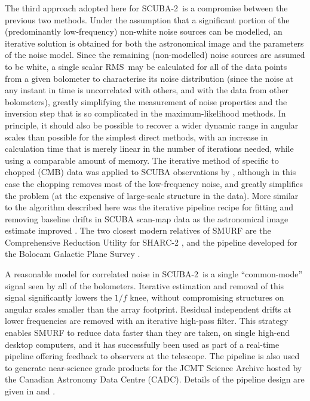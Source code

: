 \documentclass[useAMS,usenatbib,nofootinbib]{mn2e}
\newcommand{\scuba}{SCUBA-2}
\newcommand{\rms}{RMS}
\begin{document}
The third approach adopted here for \scuba\ is a compromise between
the previous two methods. Under the assumption that a significant
portion of the (predominantly low-frequency) non-white noise sources
can be modelled, an iterative solution is obtained for both the
astronomical image and the parameters of the noise model. Since the
remaining (non-modelled) noise sources are assumed to be white, a
single scalar \rms\ may be calculated for all of the data points from
a given bolometer to characterise its noise distribution (since the
noise at any instant in time is uncorrelated with others, and with the
data from other bolometers), greatly simplifying the measurement of
noise properties and the inversion step that is so complicated in the
maximum-likelihood methods. In principle, it should also be possible
to recover a wider dynamic range in angular scales than possible for
the simplest direct methods, with an increase in calculation time that
is merely linear in the number of iterations needed, while using a
comparable amount of memory. The iterative method of
\citet{wright1996} specific to chopped (CMB) data was applied to SCUBA
observations by \citet{johnstone2000}, although in this case the
chopping removes most of the low-frequency noise, and greatly
simplifies the problem (at the expensive of large-scale structure in
the data). More similar to the algorithm described here was the
iterative pipeline recipe for fitting and removing baseline drifts in
SCUBA scan-map data as the astronomical image estimate improved
\citep{1999ASPC..172..171J}. The two closest modern relatives of SMURF
are the Comprehensive Reduction Utility for SHARC-2
\citep[CRUSH,][]{kovacs2008}, and the pipeline developed for the
Bolocam Galactic Plane Survey \citep[][which uses iterative PCA
cleaning to avoid the suppression of large-scale
structure]{aguirre2011}.

A reasonable model for correlated noise in \scuba\ is a single
``common-mode'' signal seen by all of the bolometers. Iterative
estimation and removal of this signal significantly lowers the $1/f$
knee, without compromising structures on angular scales smaller than
the array footprint. Residual independent drifts at lower frequencies
are removed with an iterative high-pass filter. This strategy enables
SMURF to reduce data faster than they are taken, on single high-end
desktop computers, and it has successfully been used as part of a
real-time pipeline offering feedback to observers at the
telescope. The pipeline is also used to generate near-science grade
products for the JCMT Science Archive \citep{2011ASPC..442..203E}
hosted by the Canadian Astronomy Data Centre (CADC). Details of the
pipeline design are given in \citet{gibb2005} and
\citet{2008AN....329..295C}.
\end{document}
